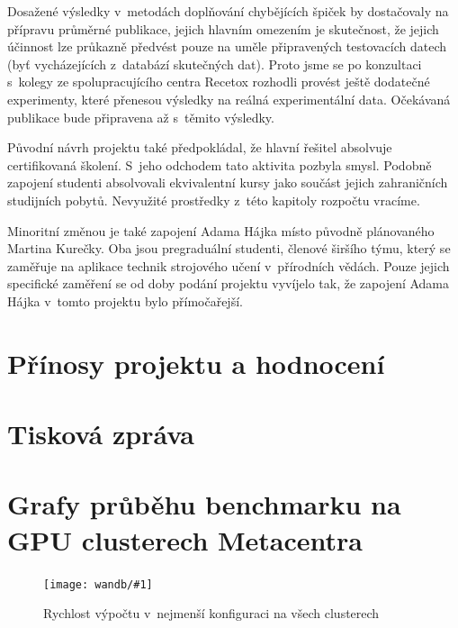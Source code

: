 \documentclass[a4paper,11pt]{article}
\begin{document}
Dosažené výsledky v~metodách doplňování chybějících špiček by dostačovaly na přípravu průměrné publikace,
jejich hlavním omezením je skutečnost, že jejich účinnost lze průkazně předvést pouze na uměle připravených
testovacích datech (byť vycházejících z~databází skutečných dat).
Proto jsme se po konzultaci s~kolegy ze spolupracujícího centra Recetox rozhodli provést ještě dodatečné
experimenty, které přenesou výsledky na reálná experimentální data.
Očekávaná publikace bude připravena až s~těmito výsledky.

Původní návrh projektu také předpokládal, že hlavní řešitel absolvuje certifikovaná školení.
S~jeho odchodem tato aktivita pozbyla smysl. Podobně zapojení studenti absolvovali ekvivalentní kursy
jako součást jejich zahraničních studijních pobytů.
Nevyužité prostředky z~této kapitoly rozpočtu vracíme.

Minoritní změnou je také zapojení Adama Hájka místo původně plánovaného Martina Kurečky.
Oba jsou pregraduální studenti, členové širšího týmu, který se zaměřuje na aplikace 
technik strojového učení v~přírodních vědách.
Pouze jejich specifické zaměření se od doby podání projektu vyvíjelo tak, že
zapojení Adama Hájka v~tomto projektu bylo přímočařejší.


\section{Přínosy projektu a hodnocení}



\section{Tisková zpráva}

\twocolumn
\appendix
\section{Grafy průběhu benchmarku na GPU clusterech Metacentra}

\def\graph#1#2{
\begin{figure}[h]
\begin{center}
\texttt{[image: wandb/\#1]}
\caption{#2}
\label{f:#1}
\end{center}
\end{figure}
}

\graph{all_6_6_300_1_64_32}{Rychlost výpočtu v~nejmenší konfiguraci na všech clusterech}
\end{document}
